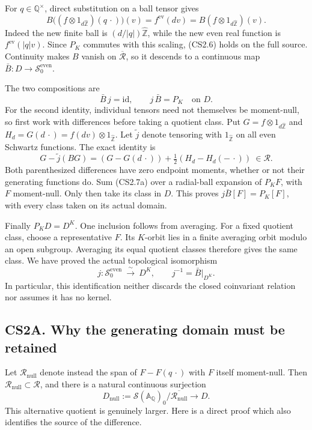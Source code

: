 For \(q\in\mathbb Q^\times\), direct substitution on a ball tensor gives
\[
B\bigl((f\otimes1_{d\widehat{\mathbb Z}})(q\,\cdot)\bigr)(v)
=f^{\mathrm{ev}}(dv)
=B(f\otimes1_{d\widehat{\mathbb Z}})(v).
\tag{CS2.6}
\] Indeed the new finite ball is \((d/|q|)\widehat{\mathbb Z}\), while
the new even real function is \(f^{\mathrm{ev}}(|q|v)\). Since \(P_K\)
commutes with this scaling, (CS2.6) holds on the full source. Continuity
makes \(B\) vanish on \(\overline{\mathcal R}\), so it descends to a
continuous map \(\bar B:D\to\mathcal S_0^{\mathrm{even}}\).

The two compositions are \[
\bar B\,j=\mathrm{id},\qquad j\,\bar B=P_K\quad\text{on }D.
\tag{CS2.7}
\] For the second identity, individual tensors need not themselves be
moment-null, so first work with differences before taking a quotient
class. Put \(G=f\otimes1_{d\widehat{\mathbb Z}}\) and
\(H_d=G(d\,\cdot)=f(dv)\otimes1_{\widehat{\mathbb Z}}\). Let
\(\widetilde j\) denote tensoring with \(1_{\widehat{\mathbb Z}}\) on
all even Schwartz functions. The exact identity is \[
G-\widetilde j(BG)
=(G-G(d\,\cdot))+\tfrac12(H_d-H_d(-\,\cdot))
\ \in\mathcal R.
\tag{CS2.7a}
\] Both parenthesized differences have zero endpoint moments, whether or
not their generating functions do. Sum (CS2.7a) over a radial-ball
expansion of \(P_KF\), with \(F\) moment-null. Only then take its class
in \(D\). This proves \(j\bar B[F]=P_K[F]\), with every class taken on
its actual domain.

Finally \(P_KD=D^K\). One inclusion follows from averaging. For a fixed
quotient class, choose a representative \(F\). Its \(K\)-orbit lies in a
finite averaging orbit modulo an open subgroup. Averaging its equal
quotient classes therefore gives the same class. We have proved the
actual topological isomorphism \[
\boxed{j:\mathcal S_0^{\mathrm{even}}\ \xrightarrow{\ \sim\ }\ D^K,
\qquad j^{-1}=\bar B|_{D^K}.}
\tag{CS2.8}
\] In particular, this identification neither discards the closed
coinvariant relation nor assumes it has no kernel.

\subsection{CS2A. Why the generating domain must be
retained}\label{cs2a.-why-the-generating-domain-must-be-retained}

Let \(\mathcal R_{\mathrm{null}}\) denote instead the span of
\(F-F(q\,\cdot)\) with \(F\) itself moment-null. Then
\(\mathcal R_{\mathrm{null}}\subset\mathcal R\), and there is a natural
continuous surjection \[
D_{\mathrm{null}}:=
\mathcal S(\mathbb A_{\mathbb Q})_0/
\overline{\mathcal R_{\mathrm{null}}}
\longrightarrow D.
\tag{CS2A.1}
\] This alternative quotient is genuinely larger. Here is a direct proof
which also identifies the source of the difference.

